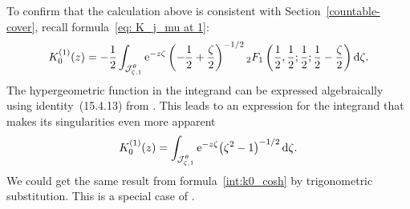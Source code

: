 \documentclass[pdftex]{sigma}
\numberwithin{equation}{section}
\begin{document}
To confirm that the calculation above is consistent with Section~\ref{countable-cover}, recall formula~\eqref{eq: K_j_mu at 1}:
\[ K_0^{(1)}(z) = -\frac{1}{2} \int_{\mathcal{J}^\theta_{\zeta, 1}} {\rm e}^{-z\zeta} \left(-\frac{1}{2}+\frac{\zeta}{2}\right)^{-1/2} {}_2F_1\left(\frac{1}{2}, \frac{1}{2}; \frac{1}{2}; \frac{1}{2} - \frac{\zeta}{2}\right) {\rm d}\zeta. \]
The hypergeometric function in the integrand can be expressed algebraically using identi\-ty~(15.4.13) from \cite{dlmf}. This leads to an expression for the integrand that makes its  singularities even more apparent
\[%
K_0^{(1)}(z) = \int_{\mathcal{J}^\theta_{\zeta, 1}} {\rm e}^{-z\zeta} \bigl(\zeta^2 - 1\bigr)^{-1/2}\, {\rm d}\zeta.
\]
We could get the same result from formula~\eqref{int:k0_cosh} by trigonometric substitution. This is a special case of \cite[formula~(10.32.8)]{dlmf}.
%
\end{document}

